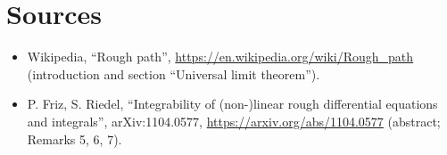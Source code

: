 \documentclass[11pt]{article}
\theoremstyle{remark}
\begin{document}
\section*{Sources}
\begin{itemize}
\item Wikipedia, ``Rough path'', \url{https://en.wikipedia.org/wiki/Rough_path} (introduction and
section ``Universal limit theorem'').
\item P. Friz, S. Riedel, ``Integrability of (non-)linear rough differential equations and
integrals'', arXiv:1104.0577, \url{https://arxiv.org/abs/1104.0577} (abstract; Remarks 5, 6, 7).
\end{itemize}
\end{document}
